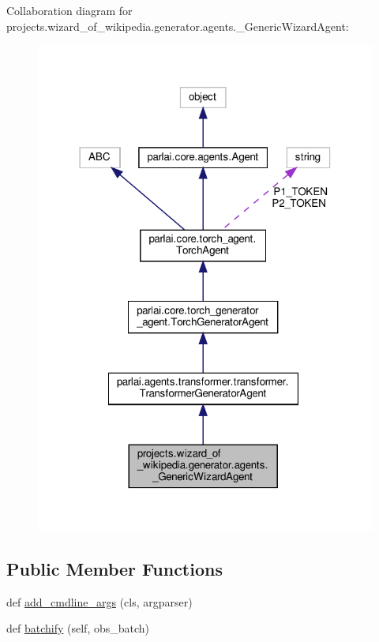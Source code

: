 Collaboration diagram for projects.\+wizard\+\_\+of\+\_\+wikipedia.\+generator.\+agents.\+\_\+\+Generic\+Wizard\+Agent\+:
\nopagebreak
\begin{figure}[H]
\begin{center}
\leavevmode
\includegraphics[width=318pt]{classprojects_1_1wizard__of__wikipedia_1_1generator_1_1agents_1_1__GenericWizardAgent__coll__graph}
\end{center}
\end{figure}
\subsection*{Public Member Functions}
\begin{DoxyCompactItemize}
\item 
def \hyperlink{classprojects_1_1wizard__of__wikipedia_1_1generator_1_1agents_1_1__GenericWizardAgent_a09eb1c8f228b2d4fa8030466e86d0b59}{add\+\_\+cmdline\+\_\+args} (cls, argparser)
\item 
def \hyperlink{classprojects_1_1wizard__of__wikipedia_1_1generator_1_1agents_1_1__GenericWizardAgent_a898b6da1e93aa458966616f0208681fc}{batchify} (self, obs\+\_\+batch)
\end{DoxyCompactItemize}
